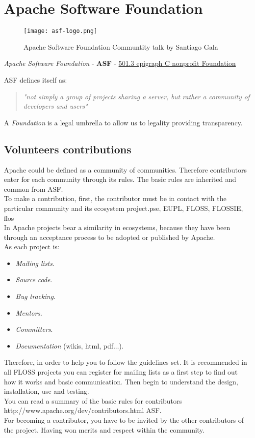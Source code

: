 \section{Apache Software Foundation}
\label{sec:asf}

\begin{figure}[H]
    \centering
    \texttt{[image: asf-logo.png]}
    \caption{Apache Software Foundation Communtity talk by Santiago Gala}
    \label{apache-logo}
\end{figure}

\textit{Apache Software Foundation} - \textbf{ASF} - \href{http://en.wikipedia.org/wiki/501(c)_organization#501.28c.29.283.29}{501.3 epigraph C nonprofit Foundation}

ASF defines itself as:
\begin{quotation}
    \emph{"not simply a group of projects sharing a server, but rather a community of developers and users"}
\end{quotation}

A \textit{Foundation} is a legal umbrella to allow us to legality providing transparency.

\subsection{Volunteers contributions}

\par Apache could be defined as a community of communities. Therefore contributors enter for each community through its rules. The basic rules are inherited and common from ASF.
\\ To make a contribution, first, the contributor must be in contact with the particular community and its ecosystem project.pse, EUPL, FLOSS, FLOSSIE, flos
\\ In Apache projects bear a similarity in ecosystems, because they have been through an acceptance process to be adopted or published by Apache.
\\ As each project is:
\begin{itemize}
	\item \textit{Mailing lists}.
	\item \textit{Source code}.
	\item \textit{Bug tracking}.
	\item \textit{Mentors}.
	\item \textit{Committers}.
	\item \textit{Documentation} (wikis, html, pdf...).
\end{itemize} Therefore, in order to help you to follow the guidelines set. It is recommended in all FLOSS projects you can register for mailing lists as a first step to find out how it works and basic communication. Then begin to understand the design, installation, use and testing.
\\ You can read a summary of the basic rules for contributors http://www.apache.org/dev/contributors.html ASF.
\\ For becoming a contributor, you have to be invited by the other contributors of the project. Having won merits and respect within the community.

